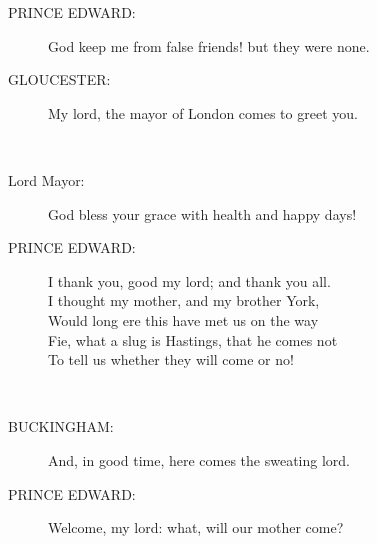 \documentclass{article}
\begin{document}
\begin{description}
\item[PRINCE EDWARD:] 
\hspace{1pt}God keep me from false friends! but they were none.\\
\end{description}
\begin{description}
\item[GLOUCESTER:] 
\hspace{1pt}My lord, the mayor of London comes to greet you.\\
\end{description}
\\
\begin{description}
\item[Lord Mayor:] 
\hspace{1pt}God bless your grace with health and happy days!\\
\end{description}
\begin{description}
\item[PRINCE EDWARD:] 
\hspace{1pt}I thank you, good my lord; and thank you all.\\
\hspace{1pt}I thought my mother, and my brother York,\\
\hspace{1pt}Would long ere this have met us on the way\\
\hspace{1pt}Fie, what a slug is Hastings, that he comes not\\
\hspace{1pt}To tell us whether they will come or no!\\
\end{description}
\\
\begin{description}
\item[BUCKINGHAM:] 
\hspace{1pt}And, in good time, here comes the sweating lord.\\
\end{description}
\begin{description}
\item[PRINCE EDWARD:] 
\hspace{1pt}Welcome, my lord: what, will our mother come?\\
\end{description}
\end{document}
